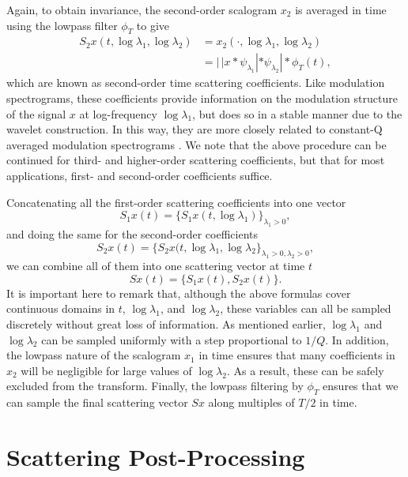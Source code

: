 \documentclass{article}
\newcommand{\lau}{{\lambda_1}}
\newcommand{\lad}{{\lambda_2}}
\begin{document}
\begin{sloppy}
Again, to obtain invariance, the second-order scalogram $x_2$ is averaged in time using the lowpass filter $\phi_T$ to give
\begin{align}
	\nonumber
	S_2 x(t, \log \lau, \log \lad) &= x_2(\cdot, \log \lau, \log \lad) \\
	&= |\,| x \ast \psi_\lau | \ast \psi_\lad | \ast \phi_T(t),
\end{align}
which are known as second-order time scattering coefficients. Like modulation spectrograms, these coefficients provide information on the modulation structure of the signal $x$ at log-frequency $\log \lau$, but does so in a stable manner due to the wavelet construction. In this way, they are more closely related to constant-Q averaged modulation spectrograms \cite{ellis-mcdermott}. We note that the above procedure can be continued for third- and higher-order scattering coefficients, but that for most applications, first- and second-order coefficients suffice.

Concatenating all the first-order scattering coefficients into one vector
\begin{equation}
	S_1x(t) = \{S_1x(t, \log \lau)\}_{\lau>0},
\end{equation}
and doing the same for the second-order coefficients
\begin{equation}
	S_2x(t) = \{S_2x(t, \log \lau, \log \lad\}_{\lau>0, \lad>0},
\end{equation}
we can combine all of them into one scattering vector at time $t$
\begin{equation}
	Sx(t) = \{S_1x(t), S_2x(t)\}.
\end{equation}
It is important here to remark that, although the above formulas cover continuous domains in $t$, $\log \lau$, and $\log \lad$, these variables can all be sampled discretely without great loss of information. As mentioned earlier, $\log \lau$ and $\log \lad$ can be sampled uniformly with a step proportional to $1/Q$. In addition, the lowpass nature of the scalogram $x_1$ in time ensures that many coefficients in $x_2$ will be negligible for large values of $\log \lad$. As a result, these can be safely excluded from the transform. Finally, the lowpass filtering by $\phi_T$ ensures that we can sample the final scattering vector $Sx$ along multiples of $T/2$ in time.

\section{Scattering Post-Processing}
\label{sec:post}


\end{sloppy}
\end{document}
